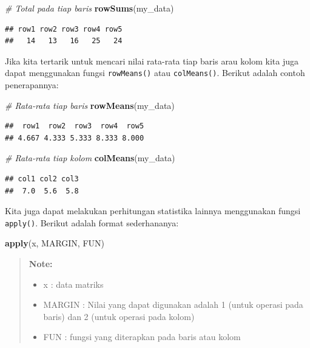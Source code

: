 \documentclass[]{book}
\newenvironment{Shaded}{\begin{snugshade}}{\end{snugshade}}
\newcommand{\KeywordTok}[1]{\textcolor[rgb]{0.13,0.29,0.53}{\textbf{#1}}}
\newcommand{\CommentTok}[1]{\textcolor[rgb]{0.56,0.35,0.01}{\textit{#1}}}
\newcommand{\NormalTok}[1]{#1}
\providecommand{\tightlist}{%
  \setlength{\itemsep}{0pt}\setlength{\parskip}{0pt}}
\begin{document}
\begin{Shaded}
\begin{Highlighting}[]
\CommentTok{# Total pada tiap baris}
\KeywordTok{rowSums}\NormalTok{(my_data)}
\end{Highlighting}
\end{Shaded}

\begin{verbatim}
## row1 row2 row3 row4 row5 
##   14   13   16   25   24
\end{verbatim}

Jika kita tertarik untuk mencari nilai rata-rata tiap baris arau kolom
kita juga dapat menggunakan fungsi \texttt{rowMeans()} atau
\texttt{colMeans()}. Berikut adalah contoh penerapannya:

\begin{Shaded}
\begin{Highlighting}[]
\CommentTok{# Rata-rata tiap baris}
\KeywordTok{rowMeans}\NormalTok{(my_data)}
\end{Highlighting}
\end{Shaded}

\begin{verbatim}
##  row1  row2  row3  row4  row5 
## 4.667 4.333 5.333 8.333 8.000
\end{verbatim}

\begin{Shaded}
\begin{Highlighting}[]
\CommentTok{# Rata-rata tiap kolom}
\KeywordTok{colMeans}\NormalTok{(my_data)}
\end{Highlighting}
\end{Shaded}

\begin{verbatim}
## col1 col2 col3 
##  7.0  5.6  5.8
\end{verbatim}

Kita juga dapat melakukan perhitungan statistika lainnya menggunakan
fungsi \texttt{apply()}. Berikut adalah format sederhananya:

\begin{Shaded}
\begin{Highlighting}[]
\KeywordTok{apply}\NormalTok{(x, MARGIN, FUN)}
\end{Highlighting}
\end{Shaded}

\begin{quote}
\textbf{Note: }

\begin{itemize}
\tightlist
\item
  x : data matriks
\item
  MARGIN : Nilai yang dapat digunakan adalah 1 (untuk operasi pada
  baris) dan 2 (untuk operasi pada kolom)
\item
  FUN : fungsi yang diterapkan pada baris atau kolom
\end{itemize}
\end{quote}
\end{document}

